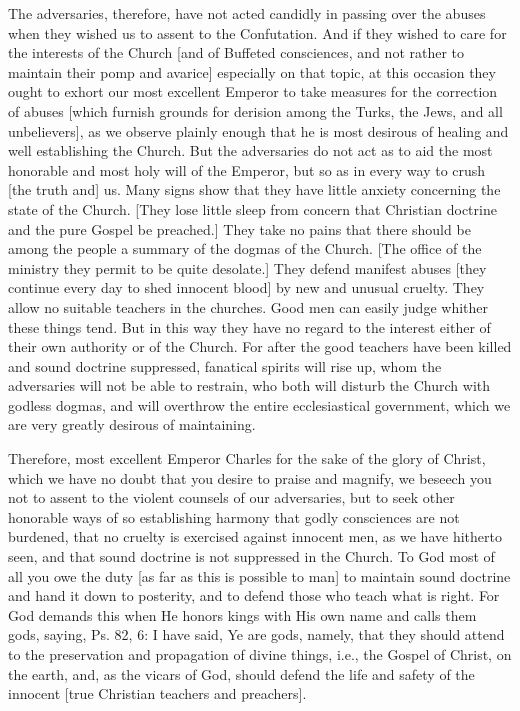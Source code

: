 The adversaries, therefore, have not acted candidly in passing over
the abuses when they wished us to assent to the Confutation.  And if
they wished to care for the interests of the Church [and of Buffeted
consciences, and not rather to maintain their pomp and avarice]
especially on that topic, at this occasion they ought to exhort our
most excellent Emperor to take measures for the correction of abuses
[which furnish grounds for derision among the Turks, the Jews, and
all unbelievers], as we observe plainly enough that he is most
desirous of healing and well establishing the Church.  But the
adversaries do not act as to aid the most honorable and most holy
will of the Emperor, but so as in every way to crush [the truth and]
us.  Many signs show that they have little anxiety concerning the
state of the Church.  [They lose little sleep from concern that
Christian doctrine and the pure Gospel be preached.] They take no
pains that there should be among the people a summary of the dogmas
of the Church.  [The office of the ministry they permit to be quite
desolate.] They defend manifest abuses [they continue every day to
shed innocent blood] by new and unusual cruelty.  They allow no
suitable teachers in the churches.  Good men can easily judge whither
these things tend.  But in this way they have no regard to the
interest either of their own authority or of the Church.  For after
the good teachers have been killed and sound doctrine suppressed,
fanatical spirits will rise up, whom the adversaries will not be able
to restrain, who both will disturb the Church with godless dogmas,
and will overthrow the entire ecclesiastical government, which we are
very greatly desirous of maintaining.

Therefore, most excellent Emperor Charles for the sake of the glory
of Christ, which we have no doubt that you desire to praise and
magnify, we beseech you not to assent to the violent counsels of our
adversaries, but to seek other honorable ways of so establishing
harmony that godly consciences are not burdened, that no cruelty is
exercised against innocent men, as we have hitherto seen, and that
sound doctrine is not suppressed in the Church.  To God most of all
you owe the duty [as far as this is possible to man] to maintain
sound doctrine and hand it down to posterity, and to defend those who
teach what is right.  For God demands this when He honors kings with
His own name and calls them gods, saying, Ps. 82, 6: I have said, Ye
are gods, namely, that they should attend to the preservation and
propagation of divine things, i.e., the Gospel of Christ, on the
earth, and, as the vicars of God, should defend the life and safety
of the innocent [true Christian teachers and preachers].




